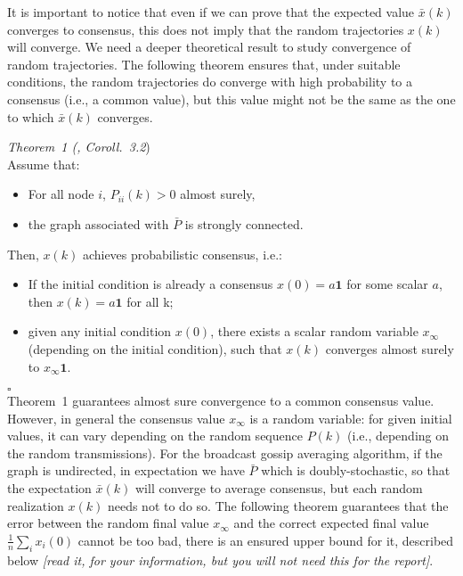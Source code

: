 \documentclass{article}
\begin{document}
It is important to notice that even if we can prove that the expected value $\bar x(k)$ converges to consensus, this does not imply that the random trajectories $x(k)$ will converge.
We need a deeper theoretical result to study convergence of random trajectories. The following theorem ensures that, under suitable conditions, the random trajectories do converge with high probability to a consensus (i.e., a common value), but this value might not be the same as the one to which $\bar x(k)$ converges.

	\textit{Theorem~1 (\cite{gossip-converg-as}, Coroll.~3.2})\\
	Assume that:
		\begin{itemize}
		\item For all node $i$, $P_{ii}(k)>0$ almost surely,
		\item the graph associated with $\bar P$ is strongly connected.
		\end{itemize}
	Then, $x(k)$ achieves probabilistic consensus, i.e.:
		\begin{itemize}
		\item If the initial condition is already a consensus $x(0) = a \mathbf 1$ for some scalar $a$, then
		$x(k) = a \mathbf 1$ for all k;
		\item given any initial condition $x(0)$, there exists a scalar random variable $x_{\infty}$ (depending on the initial condition), such that $x(k)$ converges almost surely to $x_{\infty} \mathbf 1$.
		\end{itemize}
	\hfill $\square$ \\

	 Theorem~1 guarantees almost sure convergence to a common consensus value. However, in general the consensus value $x_{\infty}$ is a random variable: for given initial values, it can vary depending on the random sequence $P(k)$ (i.e., depending on the random transmissions). For the broadcast gossip averaging algorithm, if the graph is undirected, in expectation we have $\bar P$ which is doubly-stochastic, so that the expectation $\bar x(k)$ will converge to average consensus, but each random realization $x(k)$ needs not to do so. The following theorem guarantees that the error between the random final value $x_{\infty}$ and the correct expected final value $\frac{1}{n}\sum_i x_i(0)$ cannot be too bad, there is an ensured upper bound for it, described below \textit{[read it, for your information, but you will not need this for the report]}.
\end{document}
